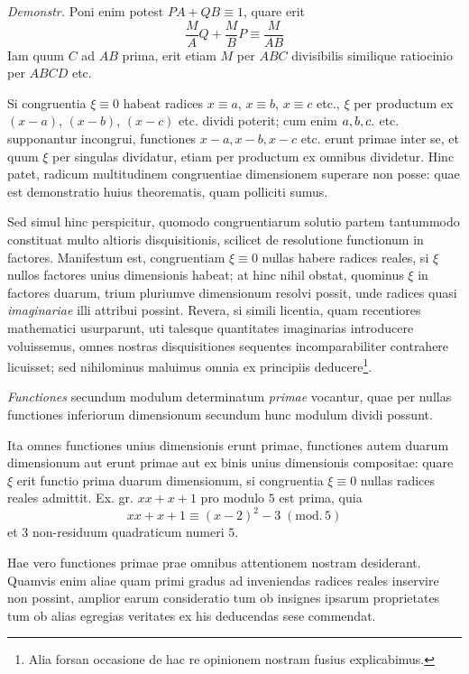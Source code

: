 \emph{Demonstr.} Poni enim potest $PA+QB\equiv1$, quare erit
\[
\frac MA Q+\frac MB P\equiv\frac M{AB}
\]
Iam quum $C$ ad $AB$ prima, erit etiam $M$ per $ABC$ divisibilis similique ratiocinio per $ABCD$ etc.

Si congruentia $\xi\equiv0$ habeat radices $x\equiv a$, $x\equiv b$, $x\equiv c$ etc., $\xi$ per productum ex $(x-a)$, $(x-b)$, $(x-c)$ etc. dividi poterit; cum enim $a,b,c\mathbin{.}$ etc. supponantur incongrui, functiones $x-a,x-b,x-c$ etc. erunt primae inter se, et quum $\xi$ per singulas dividatur, etiam per productum ex omnibus dividetur. Hinc patet, radicum multitudinem congruentiae dimensionem superare non posse: quae est demonstratio huius theorematis, quam polliciti sumus.

Sed simul hinc perspicitur, quomodo congruentiarum solutio partem tantummodo constituat multo altioris disquisitionis, scilicet de resolutione functionum in factores. Manifestum est, congruentiam $\xi\equiv0$ nullas habere radices reales, si $\xi$ nullos factores unius dimensionis habeat; at hinc nihil obstat, quominus $\xi$ in factores duarum, trium pluriumve dimensionum resolvi possit, unde radices quasi \emph{imaginariae} illi attribui possint. Revera, si simili licentia, quam recentiores mathematici usurparunt, uti talesque quantitates imaginarias introducere 
%
voluissemus, omnes nostras disquisitiones sequentes incomparabiliter contrahere licuisset; sed nihilominus maluimus omnia ex principiis deducere\begingroup\renewcommand{\thefootnote}{*)}\footnote{Alia forsan occasione de hac re opinionem nostram fusius explicabimus.}\endgroup.

\emph{Functiones} secundum modulum determinatum \emph{primae} vocantur, quae per nullas functiones inferiorum dimensionum secundum hunc modulum dividi possunt.

Ita omnes functiones unius dimensionis erunt primae, functiones autem duarum dimensionum aut erunt primae aut ex binis unius dimensionis compositae: quare $\xi$ erit functio prima duarum dimensionum, si congruentia $\xi\equiv0$ nullas radices reales admittit. Ex. gr. $xx+x+1$ pro modulo $5$ est prima, quia
\[
xx+x+1\equiv(x-2)^2-3\;(\mathrm{mod.}\,5)
\]
et $3$ non-residuum quadraticum numeri $5$.

Hae vero functiones primae prae omnibus attentionem nostram desiderant. Quamvis enim aliae quam primi gradus ad inveniendas radices reales inservire non possint, amplior earum consideratio tum ob insignes ipsarum proprietates tum ob alias egregias veritates ex his deducendas sese commendat.

